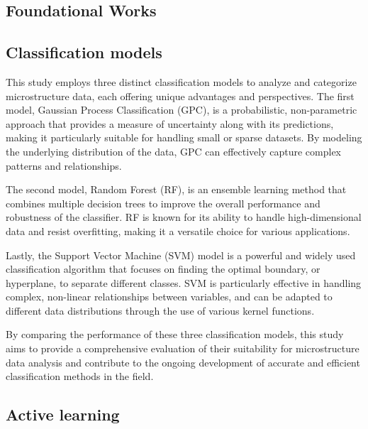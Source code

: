 \documentclass[10pt]{article}
\begin{document}
\begin{multicols}{2}
\raggedcolumns

\section{Foundational Works}

\subsection{Classification models}

This study employs three distinct classification models to analyze and categorize microstructure data, each offering unique advantages and perspectives. The first model, Gaussian Process Classification\cite{rasmussen_gaussian_2005} (GPC), is a probabilistic, non-parametric approach that provides a measure of uncertainty along with its predictions, making it particularly suitable for handling small or sparse datasets. By modeling the underlying distribution of the data, GPC can effectively capture complex patterns and relationships.

The second model, Random Forest\cite{gu_active_2015}\cite{breiman2001random} (RF), is an ensemble learning method that combines multiple decision trees to improve the overall performance and robustness of the classifier. RF is known for its ability to handle high-dimensional data and resist overfitting, making it a versatile choice for various applications.

Lastly, the Support Vector Machine\cite{cortes1995support} (SVM) model is a powerful and widely used classification algorithm that focuses on finding the optimal boundary, or hyperplane, to separate different classes. SVM is particularly effective in handling complex, non-linear relationships between variables, and can be adapted to different data distributions through the use of various kernel functions.

By comparing the performance of these three classification models, this study aims to provide a comprehensive evaluation of their suitability for microstructure data analysis and contribute to the ongoing development of accurate and efficient classification methods in the field.

\subsection{Active learning}


\end{multicols}
\end{document}
